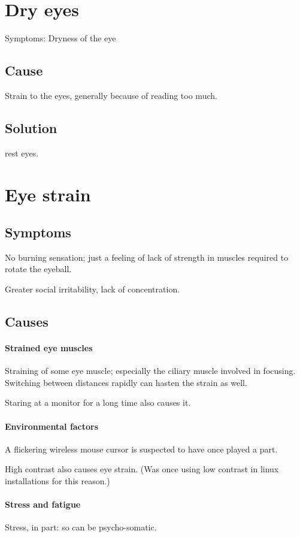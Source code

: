 \documentclass[oneside, article]{memoir}
\begin{document}
\section{Dry eyes}
Symptoms: Dryness of the eye

\subsection{Cause}
Strain to the eyes, generally because of reading too much.

\subsection{Solution}
rest eyes.

\section{Eye strain}
\subsection{Symptoms}
No burning sensation; just a feeling of lack of strength in muscles required to rotate the eyeball.

Greater social irritability, lack of concentration.

\subsection{Causes}
\paragraph*{Strained eye muscles}
Straining of some eye muscle; especially the ciliary muscle involved in focusing. Switching between distances rapidly can hasten the strain as well.

Staring at a monitor for a long time also causes it.

\paragraph*{Environmental factors}
A flickering wireless mouse cursor is suspected to have once played a part.

High contrast also causes eye strain. (Was once using low contrast in linux installations for this reason.)

\paragraph*{Stress and fatigue}
Stress, in part: so can be psycho-somatic. 
\end{document}
